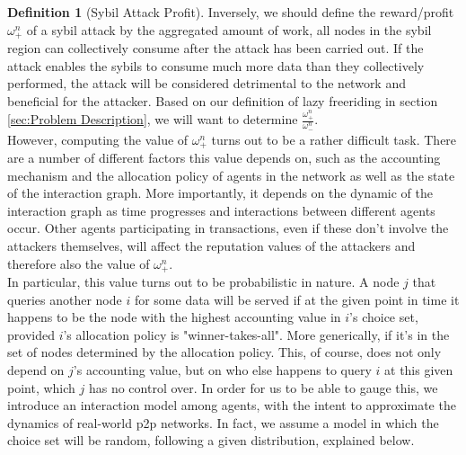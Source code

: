 \documentclass[11pt,a4paper]{article}
\theoremstyle{definition}
\newtheorem{definition}{Definition}[section]
\theoremstyle{theorem}
\theoremstyle{proposition}
\theoremstyle{corollary}
\theoremstyle{lemma}
\theoremstyle{example}
\theoremstyle{remark}
\begin{document}
\begin{definition}[Sybil Attack Profit]
\noindent{}Inversely, we should define the reward/profit $\omega_{+}^{n}$ of a sybil attack by the aggregated amount of work, all nodes in the sybil region can collectively consume after the attack has been carried out. If the attack enables the sybils to consume much more data than they collectively performed, the attack will be considered detrimental to the network and beneficial for the attacker. Based on our definition of lazy freeriding in section \ref{sec:Problem Description}, we will want to determine $\frac{\omega_{+}^{n}}{\omega_{-}^{n}}$. \vspace{1em}\\

\noindent{}However, computing the value of $\omega_{+}^{n}$ turns out to be a rather difficult task. There are a number of different factors this value depends on, such as the accounting mechanism and the allocation policy of agents in the network as well as the state of the interaction graph. More importantly, it depends on the dynamic of the interaction graph as time progresses and interactions between different agents occur. Other agents participating in transactions, even if these don't involve the attackers themselves, will affect the reputation values of the attackers and therefore also the value of $\omega_{+}^{n}$. \vspace{1em}\\

\noindent{}In particular, this value turns out to be probabilistic in nature. A node $j$ that queries another node $i$ for some data will be served if at the given point in time it happens to be the node with the highest accounting value in $i$'s choice set, provided $i$'s allocation policy is "winner-takes-all". More generically, if it's in the set of nodes determined by the allocation policy. This, of course, does not only depend on $j$'s accounting value, but on who else happens to query $i$ at this given point, which $j$ has no control over. In order for us to be able to gauge this, we introduce an interaction model among agents, with the intent to approximate the dynamics of real-world p2p networks. In fact, we assume a model in which the choice set will be random, following a given distribution, explained below.  \vspace{1em}\\ 


\end{definition}
\end{document}
